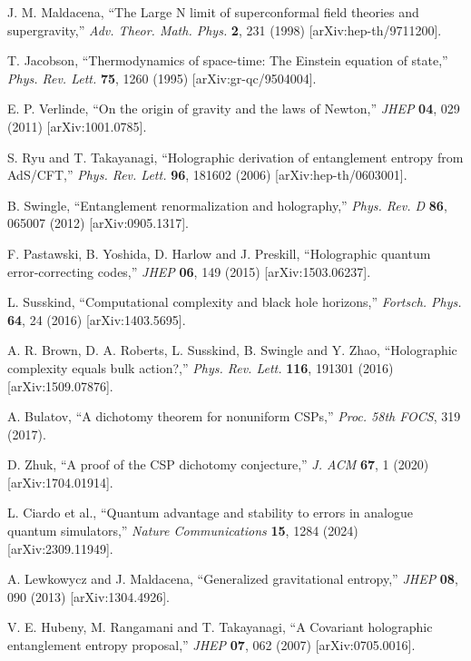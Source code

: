 \documentclass[11pt,a4paper]{article}
\theoremstyle{remark}
\theoremstyle{definition}
\begin{document}
\begin{thebibliography}{99}

J. M. Maldacena, ``The Large N limit of superconformal field theories and supergravity,''
\textit{Adv. Theor. Math. Phys.} \textbf{2}, 231 (1998) [arXiv:hep-th/9711200].

T. Jacobson, ``Thermodynamics of space-time: The Einstein equation of state,''
\textit{Phys. Rev. Lett.} \textbf{75}, 1260 (1995) [arXiv:gr-qc/9504004].

E. P. Verlinde, ``On the origin of gravity and the laws of Newton,''
\textit{JHEP} \textbf{04}, 029 (2011) [arXiv:1001.0785].

S. Ryu and T. Takayanagi, ``Holographic derivation of entanglement entropy from AdS/CFT,''
\textit{Phys. Rev. Lett.} \textbf{96}, 181602 (2006) [arXiv:hep-th/0603001].

B. Swingle, ``Entanglement renormalization and holography,''
\textit{Phys. Rev. D} \textbf{86}, 065007 (2012) [arXiv:0905.1317].

F. Pastawski, B. Yoshida, D. Harlow and J. Preskill, ``Holographic quantum error-correcting codes,''
\textit{JHEP} \textbf{06}, 149 (2015) [arXiv:1503.06237].

L. Susskind, ``Computational complexity and black hole horizons,''
\textit{Fortsch. Phys.} \textbf{64}, 24 (2016) [arXiv:1403.5695].

A. R. Brown, D. A. Roberts, L. Susskind, B. Swingle and Y. Zhao,
``Holographic complexity equals bulk action?,''
\textit{Phys. Rev. Lett.} \textbf{116}, 191301 (2016) [arXiv:1509.07876].

A. Bulatov, ``A dichotomy theorem for nonuniform CSPs,''
\textit{Proc. 58th FOCS}, 319 (2017).

D. Zhuk, ``A proof of the CSP dichotomy conjecture,''
\textit{J. ACM} \textbf{67}, 1 (2020) [arXiv:1704.01914].

L. Ciardo et al., ``Quantum advantage and stability to errors in analogue quantum simulators,''
\textit{Nature Communications} \textbf{15}, 1284 (2024) [arXiv:2309.11949].

A. Lewkowycz and J. Maldacena, ``Generalized gravitational entropy,''
\textit{JHEP} \textbf{08}, 090 (2013) [arXiv:1304.4926].

V. E. Hubeny, M. Rangamani and T. Takayanagi, ``A Covariant holographic entanglement entropy proposal,''
\textit{JHEP} \textbf{07}, 062 (2007) [arXiv:0705.0016].


\end{thebibliography}
\end{document}
